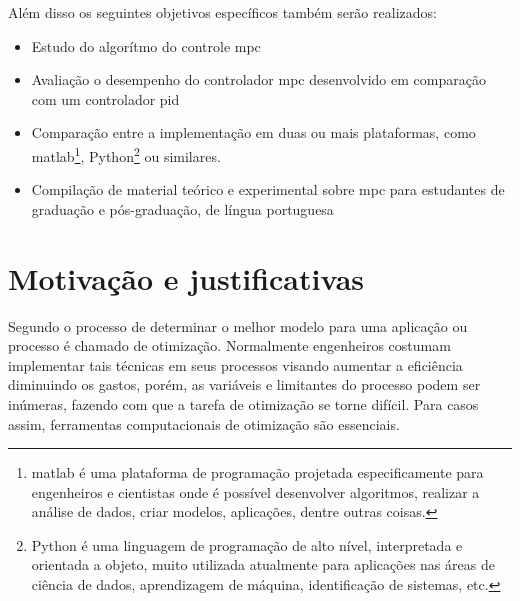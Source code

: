 Além disso os seguintes objetivos específicos também serão realizados:
\begin{itemize}
    \item Estudo do algorítmo do controle \acrshort{mpc}
    \item Avaliação o desempenho do controlador \acrshort{mpc} desenvolvido em
        comparação com um controlador \acrshort{pid}
    \item Comparação entre a implementação em duas ou mais plataformas,
        como \acrshort{matlab}\footnote{
            \acrshort{matlab} é uma plataforma                           %
            de programação projetada especificamente para engenheiros e cientistas                  %
            onde é possível desenvolver algoritmos, realizar a análise de dados,                    %
            criar modelos, aplicações, dentre outras coisas.},                                      %
        Python\footnote{
            Python é uma linguagem de programação de alto nível,                                    %
            interpretada e orientada a objeto, muito utilizada atualmente para                      %
            aplicações nas áreas de ciência de dados, aprendizagem de máquina,                      %
            identificação de sistemas, etc.}                                                        %
        ou similares.
    \item Compilação de material teórico e experimental sobre \acrshort{mpc}
        para estudantes de graduação e pós-graduação, de língua portuguesa
\end{itemize}

\section{Motivação e justificativas}
\label{sec:motivacao_e_justificativas}

Segundo  o processo de determinar o melhor modelo
para uma aplicação ou processo é chamado de otimização. Normalmente engenheiros
costumam implementar tais técnicas em seus processos visando aumentar a
eficiência diminuindo os gastos, porém, as variáveis e limitantes do processo
podem ser inúmeras, fazendo com que a tarefa de otimização se torne difícil.
Para casos assim, ferramentas computacionais de otimização são essenciais. \cite{Parkinson2018}

